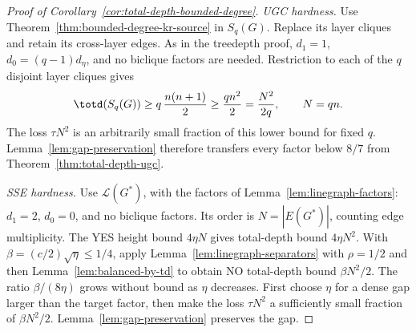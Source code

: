 \begin{proof}[Proof of Corollary~\ref{cor:total-depth-bounded-degree}]
\emph{UGC hardness.}
Use Theorem~\ref{thm:bounded-degree-kr-source} in $S_q(G)$.
Replace its layer cliques and retain its cross-layer edges.
As in the treedepth proof, $d_1=1$, $d_0=(q-1)d_\eta$, and no
biclique factors are needed. Restriction to each of the $q$
disjoint layer cliques gives
\[
 \totd(S_q(G))\ge q\,\frac{n(n+1)}2
 \ge\frac{qn^2}{2}=\frac{N^2}{2q},\qquad N=qn.
\]
The loss $\tau N^2$ is an arbitrarily small fraction of this lower
bound for fixed $q$. Lemma~\ref{lem:gap-preservation} therefore
transfers every factor below $8/7$ from
Theorem~\ref{thm:total-depth-ugc}.

\emph{SSE hardness.}
Use $\mathcal L(G^*)$, with the factors of
Lemma~\ref{lem:linegraph-factors}: $d_1=2$, $d_0=0$, and no
biclique factors. Its order is $N=|E(G^*)|$, counting edge
multiplicity. The YES height bound $4\eta N$ gives total-depth
bound $4\eta N^2$. With $\beta=(c/2)\sqrt\eta\le1/4$,
apply Lemma~\ref{lem:linegraph-separators} with $\rho=1/2$ and then
Lemma~\ref{lem:balanced-by-td} to obtain NO total-depth bound
$\beta N^2/2$.
The ratio $\beta/(8\eta)$ grows without bound as $\eta$ decreases.
First choose $\eta$ for a dense gap larger than the target factor,
then make the loss $\tau N^2$ a sufficiently small fraction of
$\beta N^2/2$. Lemma~\ref{lem:gap-preservation} preserves the gap.
\end{proof}
